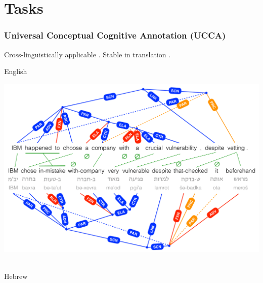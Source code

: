 \documentclass[t,xcolor={svgnames}]{beamer}
\begin{document}
\section{Tasks}

\begin{frame}
\frametitle{Universal Conceptual Cognitive Annotation (UCCA)}
Cross-linguistically applicable \cite{abend2013universal}.
Stable in translation \cite{sulem2015conceptual}.

\vfill
English\\
\vspace{-1cm}
\begin{adjustbox}{center}
  \includegraphics[width=\textwidth,height=\textheight,keepaspectratio]{crosslinguistic.png}
\end{adjustbox}
\\
\vspace{-1cm}
Hebrew
\end{frame}
\end{document}
